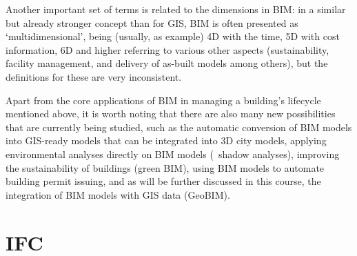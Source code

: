 

Another important set of terms is related to the dimensions in BIM: in a similar but already stronger concept than for GIS, BIM is often presented as `multidimensional', being (usually, as example) 4D with the time, 5D with cost information, 6D and higher referring to various other aspects (sustainability, facility management, and delivery of as-built models among others), but the definitions for these are very inconsistent.



Apart from the core applications of BIM in managing a building's lifecycle mentioned above, it is worth noting that there are also many new possibilities that are currently being studied, such as the automatic conversion of BIM models into GIS-ready models that can be integrated into 3D city models, applying environmental analyses directly on BIM models (\eg\ shadow analyses), improving the sustainability of buildings (green BIM), using BIM models to automate building permit issuing, and as will be further discussed in this course, the integration of BIM models with GIS data (GeoBIM).

\section{IFC}

